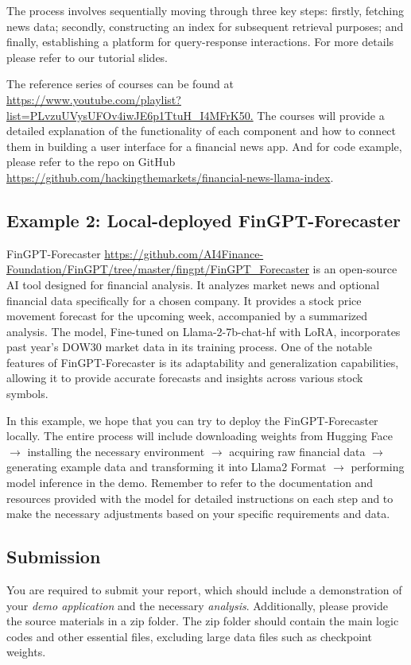 \documentclass[11pt]{article}
\begin{document}
The process involves sequentially moving through three key steps: firstly, fetching news data; secondly, constructing an index for subsequent retrieval purposes; and finally, establishing a platform for query-response interactions. For more details please refer to our tutorial slides.

The reference series of courses can be found at \url{https://www.youtube.com/playlist?list=PLvzuUVysUFOv4iwJE6p1TtuH_I4MFrK50.} The courses will provide a detailed explanation of the functionality of each component and how to connect them in building a user interface for a financial news app. And for code example, please refer to the repo on GitHub \url{https://github.com/hackingthemarkets/financial-news-llama-index}.

\subsection{Example 2: Local-deployed FinGPT-Forecaster}
FinGPT-Forecaster \url{https://github.com/AI4Finance-Foundation/FinGPT/tree/master/fingpt/FinGPT_Forecaster} is an open-source AI tool designed for financial analysis. It analyzes market news and optional financial data specifically for a chosen company. It provides a stock price movement forecast for the upcoming week, accompanied by a summarized analysis. The model, Fine-tuned on Llama-2-7b-chat-hf with LoRA, incorporates past year's DOW30 market data in its training process. One of the notable features of FinGPT-Forecaster is its adaptability and generalization capabilities, allowing it to provide accurate forecasts and insights across various stock symbols.

In this example, we hope that you can try to deploy the FinGPT-Forecaster locally. The entire process will include downloading weights from Hugging Face $\rightarrow$ installing the necessary environment $\rightarrow$ acquiring raw financial data $\rightarrow$  generating example data and transforming it into Llama2 Format $\rightarrow$  performing model inference in the demo. Remember to refer to the documentation and resources provided with the model for detailed instructions on each step and to make the necessary adjustments based on your specific requirements and data.

\subsection{Submission}
You are required to submit your report, which should include a demonstration of your \textit{demo application} and the necessary \textit{analysis}. Additionally, please provide the source materials in a zip folder. The zip folder should contain the main logic codes and other essential files, excluding large data files such as checkpoint weights.
\end{document}

